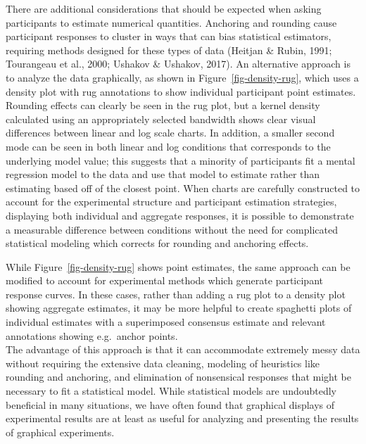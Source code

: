 \documentclass[
  10pt,
  letterpaper,
  DIV=11,
  numbers=noendperiod]{scrartcl}
\begin{document}
There are additional considerations that should be expected when asking
participants to estimate numerical quantities. Anchoring and rounding
cause participant responses to cluster in ways that can bias statistical
estimators, requiring methods designed for these types of data (Heitjan
\& Rubin, 1991; Tourangeau et al., 2000; Ushakov \& Ushakov, 2017). An
alternative approach is to analyze the data graphically, as shown in
Figure~\ref{fig-density-rug}, which uses a density plot with rug
annotations to show individual participant point estimates. Rounding
effects can clearly be seen in the rug plot, but a kernel density
calculated using an appropriately selected bandwidth shows clear visual
differences between linear and log scale charts. In addition, a smaller
second mode can be seen in both linear and log conditions that
corresponds to the underlying model value; this suggests that a minority
of participants fit a mental regression model to the data and use that
model to estimate rather than estimating based off of the closest point.
When charts are carefully constructed to account for the experimental
structure and participant estimation strategies, displaying both
individual and aggregate responses, it is possible to demonstrate a
measurable difference between conditions without the need for
complicated statistical modeling which corrects for rounding and
anchoring effects.

While Figure~\ref{fig-density-rug} shows point estimates, the same
approach can be modified to account for experimental methods which
generate participant response curves. In these cases, rather than adding
a rug plot to a density plot showing aggregate estimates, it may be more
helpful to create spaghetti plots of individual estimates with a
superimposed consensus estimate and relevant annotations showing
e.g.~anchor points.\\
The advantage of this approach is that it can accommodate extremely
messy data without requiring the extensive data cleaning, modeling of
heuristics like rounding and anchoring, and elimination of nonsensical
responses that might be necessary to fit a statistical model. While
statistical models are undoubtedly beneficial in many situations, we
have often found that graphical displays of experimental results are at
least as useful for analyzing and presenting the results of graphical
experiments.
\end{document}
